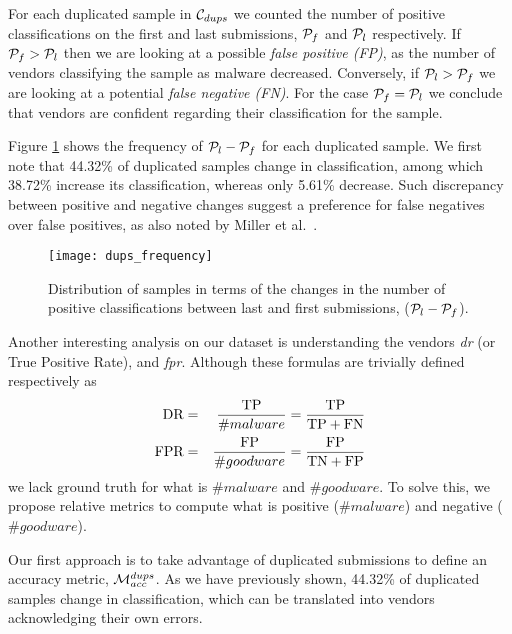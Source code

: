 For each duplicated sample in $\mathcal{C}_{dups}$ we counted the number of positive classifications on the first and last submissions, $\mathcal{P}_{f}$ and $\mathcal{P}_{l}$ respectively.
If $\mathcal{P}_{f} > \mathcal{P}_{l}$ then we are looking at a possible \emph{false positive (FP)}, as the number of vendors classifying the sample as malware decreased. Conversely,  if $\mathcal{P}_{l} > \mathcal{P}_{f}$ we are looking at a potential \emph{false negative (FN)}. For the case $\mathcal{P}_{f}=\mathcal{P}_{l}$ we conclude that vendors are confident regarding their classification for the sample.

Figure \ref{fig:distribution_changes} shows the frequency of $\mathcal{P}_{l}-\mathcal{P}_{f}$ for each duplicated sample. We first note that 44.32\% of duplicated samples change in classification, among which 38.72\% increase its classification, whereas only 5.61\% decrease.
Such discrepancy between positive and negative changes suggest a preference for false negatives over false positives, as also noted by Miller et al.~\cite{miller:rev_int}.

\begin{figure*}[]
	\texttt{[image: dups\_frequency]}
	\caption{Distribution of samples in terms of the changes in the number of positive classifications between last and first submissions, ($\mathcal{P}_{l}-\mathcal{P}_{f}$).}
	\label{fig:distribution_changes}
\end{figure*}

\medskip

Another interesting analysis on our dataset is understanding the vendors \emph{\gls{dr}} (or True Positive Rate), and \emph{\gls{fpr}}. 
Although these formulas are trivially defined respectively as
\begin{eqnarray}
\textrm{DR}&=&\frac{\textrm{TP}}{\#malware}=\frac{\textrm{TP}}{\textrm{TP}+\textrm{FN}} \\ 
\textrm{FPR}&=&\frac{\textrm{FP}}{\#goodware}=\frac{\textrm{FP}}{\textrm{TN}+\textrm{FP}}
\end{eqnarray}
we lack ground truth for what is ${\#malware}$ and $\#goodware$.
To solve this, we propose relative metrics to compute what is positive ($\#malware$) and negative ($\#goodware$).


Our first approach is to take advantage of duplicated submissions to define an accuracy metric, $\mathcal{M}_{acc}^{{dups}}$.
As we have previously shown, 44.32\% of duplicated samples change in classification, which can be translated into vendors acknowledging their own errors.


